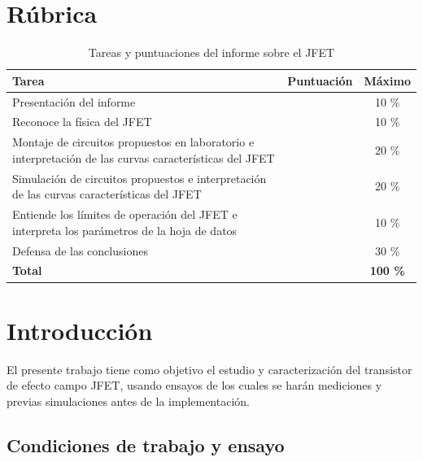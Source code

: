 \section{Rúbrica}
\begin{table}[h!]
\centering
\renewcommand{\arraystretch}{1.5}
\begin{tabular}{|>{\raggedright}p{8cm}|c|c|}
\hline
\rowcolor[HTML]{D9D9D9}
\textbf{Tarea} & \textbf{Puntuación} & \textbf{Máximo} \\
\hline
\cellcolor[HTML]{E6E6E6} Presentación del informe &  & 10 \% \\
\hline
\cellcolor[HTML]{E6E6E6} Reconoce la física del JFET &  & 10 \% \\
\hline
\cellcolor[HTML]{E6E6E6} Montaje de circuitos propuestos en laboratorio e interpretación de las curvas características del JFET &  & 20 \% \\
\hline
\cellcolor[HTML]{E6E6E6} Simulación de circuitos propuestos e interpretación de las curvas características del JFET &  & 20 \% \\
\hline
\cellcolor[HTML]{E6E6E6} Entiende los límites de operación del JFET e interpreta los parámetros de la hoja de datos &  & 10 \% \\
\hline
\cellcolor[HTML]{E6E6E6} Defensa de las conclusiones &  & 30 \% \\
\hline
\rowcolor[HTML]{C0C0C0} \textbf{Total} &  & \textbf{100 \%} \\
\hline
\end{tabular}
\caption{Tareas y puntuaciones del informe sobre el JFET}
\end{table}


\newpage

\section{Introducción}
\sangria{} El presente trabajo tiene como objetivo el estudio y caracterización del transistor de efecto campo JFET, usando ensayos de los cuales se harán mediciones y previas simulaciones antes de la implementación.

\subsection{Condiciones de trabajo y ensayo}

